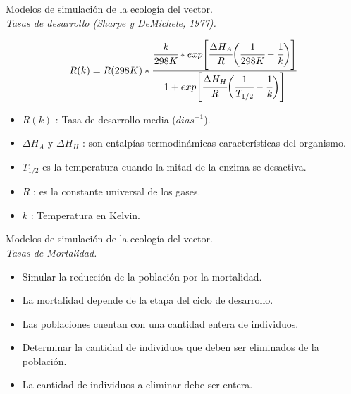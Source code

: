 \begin{frame}[t]{Modelos de simulación de la ecología del vector.\\\textit{Tasas de desarrollo
 (Sharpe y DeMichele, 1977).}}
  \begin{center}
      \begin{equation} \label{eq:schoolfield}
         R(k)  = R(298K) *\cfrac{ \cfrac{k}{298K} *
          exp \Bigg[
                  \cfrac{\Delta H_{A}}{R} \bigg(\cfrac{1}{298K} - \cfrac{1}{k}\bigg)
              \Bigg]}
          {1 + exp\Bigg[\cfrac{\Delta H_{H}}{R} \bigg(\cfrac{1}{T_{1/2}}- \cfrac{1}{k}\bigg)\Bigg] }
      \end{equation}
  \end{center}
   \begin{itemize}
      \item $R(k)$ : Tasa de desarrollo media ($dias^{-1}$).
      \item $\Delta H_{A}$ y $\Delta H_{H}$ : son entalpías termodinámicas características del organismo.
      \item $T_{1/2}$ es la temperatura cuando la mitad de la enzima se desactiva.
      \item $R$ : es la constante universal de los gases.
      \item $k$ : Temperatura en Kelvin.
    \end{itemize}
\end{frame}


\begin{frame}[c]{Modelos de simulación de la ecología del vector.\\\textit{Tasas de Mortalidad.}}
  \begin{itemize}
      \item Simular la reducción de la población por la mortalidad.
      \item La mortalidad depende de la etapa del ciclo de desarrollo.
      \item Las poblaciones cuentan con una cantidad entera de individuos.
      \item Determinar la cantidad de individuos que deben ser eliminados de la población.
      \item La cantidad de individuos a eliminar debe ser entera.
  \end{itemize}
\end{frame}

